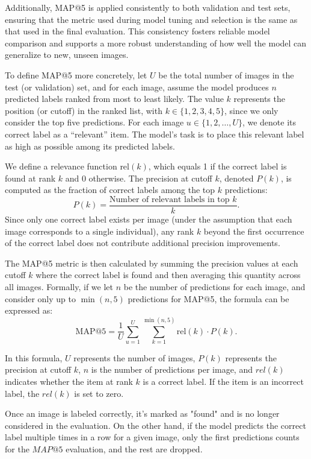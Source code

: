 \documentclass[twocolumn]{article}
\begin{document}
Additionally, MAP@5 is applied consistently to both validation and test sets, ensuring that the metric used during model tuning and selection is the same as that used in the final evaluation. This consistency fosters reliable model comparison and supports a more robust understanding of how well the model can generalize to new, unseen images.

To define MAP@5 more concretely, let \( U \) be the total number of images in the test (or validation) set, and for each image, assume the model produces \( n \) predicted labels ranked from most to least likely. The value \( k \) represents the position (or cutoff) in the ranked list, with \( k \in \{1, 2, 3, 4, 5\} \), since we only consider the top five predictions. For each image \( u \in \{1, 2, \ldots, U\} \), we denote its correct label as a “relevant” item. The model’s task is to place this relevant label as high as possible among its predicted labels. 

We define a relevance function \( \text{rel}(k) \), which equals 1 if the correct label is found at rank \( k \) and 0 otherwise. The precision at cutoff \( k \), denoted \( P(k) \), is computed as the fraction of correct labels among the top \( k \) predictions:
\[
P(k) = \frac{\text{Number of relevant labels in top } k}{k}.
\]
Since only one correct label exists per image (under the assumption that each image corresponds to a single individual), any rank \( k \) beyond the first occurrence of the correct label does not contribute additional precision improvements.

The MAP@5 metric is then calculated by summing the precision values at each cutoff \( k \) where the correct label is found and then averaging this quantity across all images. Formally, if we let \( n \) be the number of predictions for each image, and consider only up to \( \min(n, 5) \) predictions for MAP@5, the formula can be expressed as:
\[
\text{MAP@5} = \frac{1}{U} \sum_{u=1}^{U} \sum_{k=1}^{\min(n, 5)} \text{rel}(k) \cdot P(k).
\]

In this formula, \(U\) represents the number of images, \(P(k)\) represents the precision at cutoff \(k\), \(n\) is the number of predictions per image, and \(rel(k)\) indicates whether the item at rank \(k\) is a correct label. If the item is an incorrect label, the \(rel(k)\) is set to zero.

Once an image is labeled correctly, it's marked as "found" and is no longer considered in the evaluation. On the other hand, if the model predicts the correct label multiple times in a row for a given image, only the first predictions counts for the \(MAP@5\) evaluation, and the rest are dropped.
\end{document}
